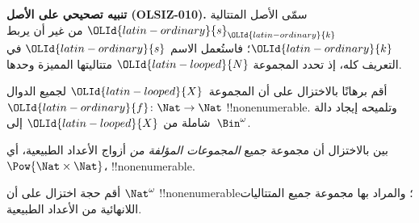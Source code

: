 \documentclass[../../../include/open-logic-section]{subfiles}
\begin{document}
\begin{editorial}
\textbf{تنبيه تصحيحي على الأصل (OLSIZ-010).}
سمّى الأصل المتتالية ${\OLId{latin-ordinary}{s}}_{\OLId{latin-ordinary}{k}}$ من غير أن يربط ${\OLId{latin-ordinary}{k}}$؛ فاستُعمل الاسم
${\OLId{latin-ordinary}{s}}$ في التعريف كله، إذ تحدد المجموعة ${\OLId{latin-looped}{N}}$ متتاليتها المميزة وحدها.
\end{editorial}


\begin{prob}\label{sfr:siz:red-alt:prob:nat-nat}
أقم برهانًا بالاختزال على أن المجموعة~${\OLId{latin-looped}{X}}$ لجميع الدوال ${\OLId{latin-ordinary}{f}}\colon \Nat \to \Nat$ !!{nonenumerable}. وتلميحه إيجاد دالة شاملة من ${\OLId{latin-looped}{X}}$ إلى~$\Bin^\omega$.
\end{prob}

\begin{prob}
بين بالاختزال أن مجموعة جميع \emph{المجموعات المؤلفة من} أزواج الأعداد الطبيعية، أي $\Pow{\Nat \times \Nat}$، !!{nonenumerable}.
\end{prob}

\begin{prob}
أقم حجة اختزال على أن $\Nat^\omega$ !!{nonenumerable}؛ والمراد بها مجموعة جميع المتتاليات اللانهائية من الأعداد الطبيعية.
\end{prob}

\end{document}
